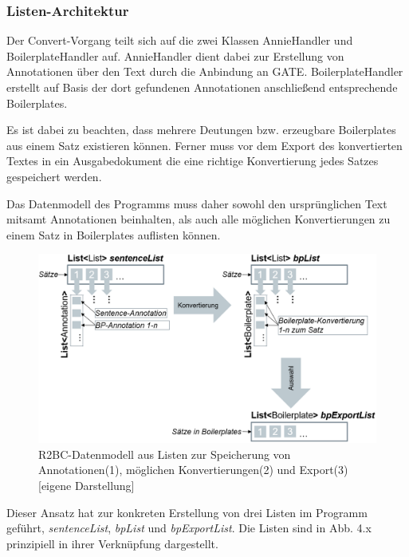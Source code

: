 \documentclass[12pt]{report}
\begin{document}
\subsubsection{Listen-Architektur}
Der Convert-Vorgang teilt sich auf die zwei Klassen AnnieHandler und BoilerplateHandler auf. AnnieHandler dient dabei zur Erstellung von Annotationen über den Text durch die Anbindung an GATE. BoilerplateHandler erstellt auf Basis der dort gefundenen Annotationen anschließend entsprechende Boilerplates. 

Es ist dabei zu beachten, dass mehrere Deutungen bzw. erzeugbare Boilerplates aus einem Satz existieren können. Ferner muss vor dem Export des konvertierten Textes in ein Ausgabedokument die eine richtige Konvertierung jedes Satzes gespeichert werden.

Das Datenmodell des Programms muss daher sowohl den ursprünglichen Text mitsamt Annotationen beinhalten, als auch alle möglichen Konvertierungen zu einem Satz in Boilerplates auflisten können.

\begin{figure}[h!]
\begin{center}
\includegraphics[scale=0.63]{Bilder/Listenarchitektur.png}
\caption{R2BC-Datenmodell aus Listen zur Speicherung von Annotationen(1), möglichen Konvertierungen(2) und Export(3) [eigene Darstellung]}
\end{center}
\end{figure}

Dieser Ansatz hat zur konkreten Erstellung von drei Listen im Programm geführt, \textit{sentenceList}, \textit{bpList} und \textit{bpExportList}. Die Listen sind in Abb. 4.x prinzipiell in ihrer Verknüpfung dargestellt. 
\end{document}
